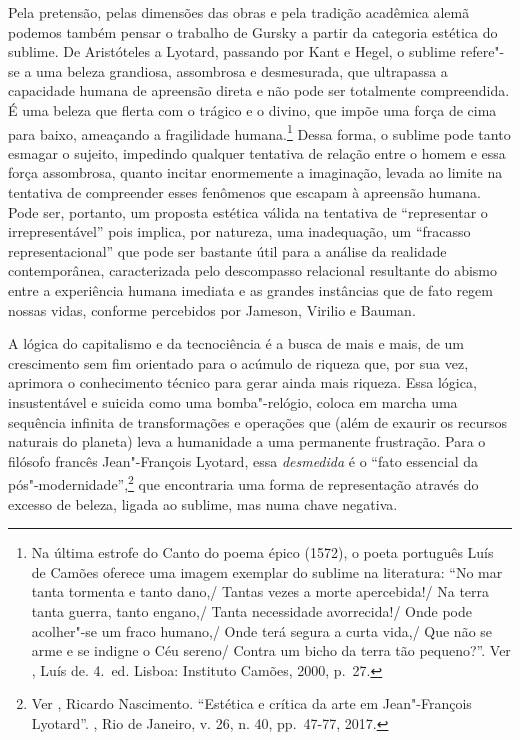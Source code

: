 Pela pretensão, pelas dimensões das obras e pela tradição acadêmica
alemã podemos também pensar o trabalho de Gursky a partir da categoria
estética do sublime. De Aristóteles a Lyotard, passando por Kant e
Hegel, o sublime refere"-se a uma beleza grandiosa, assombrosa e
desmesurada, que ultrapassa a capacidade humana de apreensão direta e
não pode ser totalmente compreendida. É uma beleza que flerta com o
trágico e o divino, que impõe uma força de cima para baixo, ameaçando a
fragilidade humana.\footnote{Na última estrofe do Canto  do poema épico
  {} (1572), o poeta português Luís de Camões oferece
  uma imagem exemplar do sublime na literatura:
``No mar tanta tormenta e tanto dano,/ Tantas vezes a morte apercebida!/ Na terra tanta guerra, tanto engano,/ Tanta necessidade avorrecida!/ Onde pode acolher"-se um fraco humano,/ Onde terá segura a curta vida,/ Que não se arme e se indigne o Céu sereno/ Contra um bicho da terra tão pequeno?''. Ver , Luís de. {} 4.~ed. Lisboa: Instituto Camões, 2000, p.~27.} Dessa forma, o sublime pode tanto esmagar o sujeito, impedindo qualquer tentativa de relação entre o homem e essa força assombrosa, quanto incitar enormemente a imaginação, levada ao limite na tentativa de compreender esses fenômenos que escapam à apreensão humana. Pode ser, portanto, um proposta estética válida na tentativa de ``representar o irrepresentável'' pois implica, por natureza, uma inadequação, um ``fracasso representacional'' que pode ser bastante
útil para a análise da realidade contemporânea, caracterizada pelo
descompasso relacional resultante do abismo entre a experiência humana
imediata e as grandes instâncias que de fato regem nossas vidas,
conforme percebidos por Jameson, Virilio e Bauman.

A lógica do capitalismo e da tecnociência é a busca de mais e mais, de
um crescimento sem fim orientado para o acúmulo de riqueza que, por sua
vez, aprimora o conhecimento técnico para gerar ainda mais riqueza. Essa
lógica, insustentável e suicida como uma bomba"-relógio, coloca em marcha
uma sequência infinita de transformações e operações que (além de
exaurir os recursos naturais do planeta) leva a humanidade a uma
permanente frustração. Para o filósofo francês Jean"-François Lyotard,
essa \emph{desmedida} é o ``fato essencial da
pós"-modernidade'',\footnote{Ver , Ricardo Nascimento. ``Estética e
  crítica da arte em Jean"-François Lyotard''. {}, Rio de
  Janeiro, v. 26, n. 40, pp.~47-77, 2017.} que encontraria uma forma de
representação através do excesso de beleza, ligada ao sublime, mas numa
chave negativa.

